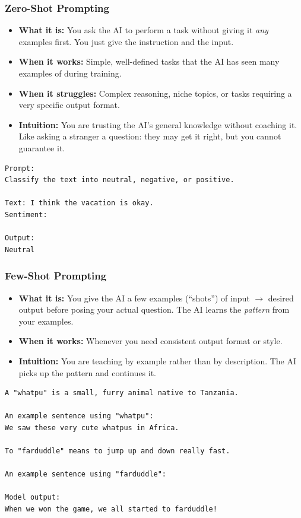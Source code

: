 \begin{frame}[fragile]\frametitle{Zero-Shot Prompting}
    \begin{itemize}
        \item \textbf{What it is:} You ask the AI to perform a task without giving it \emph{any} examples first. You just give the instruction and the input.
        \item \textbf{When it works:} Simple, well-defined tasks that the AI has seen many examples of during training.
        \item \textbf{When it struggles:} Complex reasoning, niche topics, or tasks requiring a very specific output format.
		\item \textbf{Intuition:} You are trusting the AI's general knowledge without coaching it. Like asking a stranger a question: they may get it right, but you cannot guarantee it.
    \end{itemize}
	

	
\begin{lstlisting}[language=HTML]
Prompt:
Classify the text into neutral, negative, or positive. 

Text: I think the vacation is okay.
Sentiment:

Output:
Neutral
\end{lstlisting}

\end{frame}


\begin{frame}[fragile]\frametitle{Few-Shot Prompting}
    \begin{itemize}
        \item \textbf{What it is:} You give the AI a few examples (``shots'') of input $\rightarrow$ desired output before posing your actual question. The AI learns the \emph{pattern} from your examples.
        \item \textbf{When it works:} Whenever you need consistent output format or style.
		\item \textbf{Intuition:} You are teaching by example rather than by description. The AI picks up the pattern and continues it.
    \end{itemize}



        \begin{lstlisting}[language=HTML]
A "whatpu" is a small, furry animal native to Tanzania. 

An example sentence using "whatpu":
We saw these very cute whatpus in Africa.

To "farduddle" means to jump up and down really fast. 

An example sentence using "farduddle":

Model output:
When we won the game, we all started to farduddle!
        \end{lstlisting}


\end{frame}


